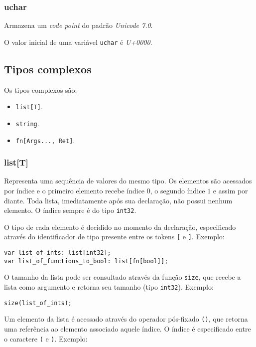 \documentclass[12pt, a4paper]{article}
\begin{document}
\subsubsection{uchar}

Armazena um \emph{code point} do padrão \emph{Unicode 7.0}.

O valor inicial de uma variável \texttt{uchar} é \emph{U+0000}.

\subsection{Tipos complexos}

Os tipos complexos são:

\begin{itemize}
\item \texttt{list[T]}.
\item \texttt{string}.
\item \texttt{fn[Args..., Ret]}.
\end{itemize}

\subsubsection{list[T]}

Representa uma sequência de valores do mesmo tipo. Os elementos são acessados
por índice e o primeiro elemento recebe índice $0$, o segundo índice $1$ e assim
por diante. Toda lista, imediatamente após sua declaração, não possui nenhum
elemento. O índice sempre é do tipo \texttt{int32}.

O tipo de cada elemento é decidido no momento da declaração, especificado
através do identificador de tipo presente entre os tokens \texttt{[} e
\texttt{]}. Exemplo:

\begin{verbatim}
var list_of_ints: list[int32];
var list_of_functions_to_bool: list[fn[bool]];
\end{verbatim}

O tamanho da lista pode ser consultado através da função \texttt{size}, que
recebe a lista como argumento e retorna seu tamanho (tipo \texttt{int32}).
Exemplo:

\begin{verbatim}
size(list_of_ints);
\end{verbatim}

Um elemento da lista é acessado através do operador pós-fixado \texttt{()}, que
retorna uma referência ao elemento associado aquele índice. O índice é
especificado entre o caractere \texttt{(} e \texttt{)}. Exemplo:
\end{document}
